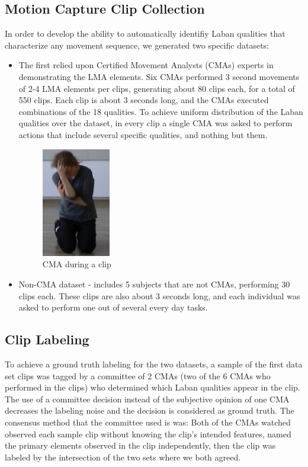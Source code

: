 \documentclass{sigchi}
\begin{document}
\subsection{Motion Capture Clip Collection}
In order to develop the ability to automatically identifiy Laban qualities that characterize any movement sequence, we generated two specific datasets:
\begin{itemize}
  \item
  The first relied upon Certified Movement Analysts (CMAs) experts in demonstrating the LMA elements. Six CMAs performed 3 second movements of 2-4 LMA elements per clips, generating about 80 clips each, for a total of 550 clips.  Each clip is about 3 seconds long, and the CMAs executed combinations of the 18 qualities.
  To achieve uniform distribution of the Laban qualities over the dataset, in every
  clip a single CMA was asked to perform actions that include several specific qualities,
  and nothing but them.
  
  \begin{figure}[h]
\centering
\includegraphics[width=30mm]{Rachelle.png}
\caption{CMA during a clip}
\label{Rachelle}
\end{figure}

\item
Non-CMA dataset - includes 5 subjects that are not CMAs, performing 30 clips each. 
These clips are also about 3 seconds long, and each individual was asked to perform one out 
of several every day tasks.
\end{itemize}
\subsection{Clip Labeling}
To achieve a ground truth labeling for the two datasets, a sample of the first data set clips was tagged by a committee of 2 CMAs (two of the 6 CMAs who performed in the clips) who determined which Laban qualities appear in the clip. The use of a committee decision instead of the subjective opinion of one CMA decreases the labeling noise and the decision is considered as ground truth. The consensus method that the committee used is was: Both of the CMAs watched observed each sample clip without knowing the clip's intended features, named the primary elements observed in the clip independently, then the clip was labeled by the intersection of the two sets where we both agreed. 
\end{document}
